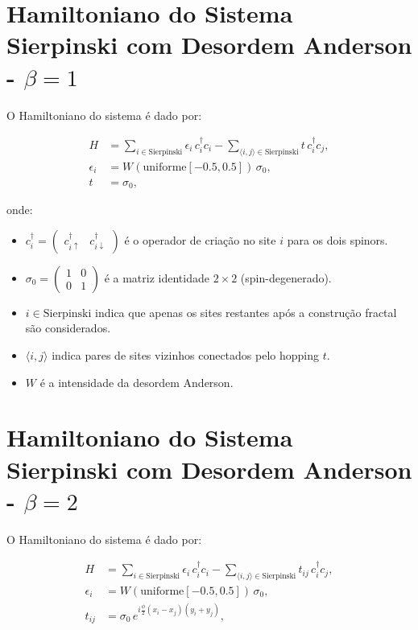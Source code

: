 \documentclass[a4paper,12pt]{article}
\begin{document}
	
	\section*{Hamiltoniano do Sistema Sierpinski com Desordem Anderson - $\beta=1$}
	
	O Hamiltoniano do sistema é dado por:
	
	\begin{equation}
		\begin{aligned}
			H &= \sum_{i \in \text{Sierpinski}} \epsilon_i \, c_i^\dagger c_i
			- \sum_{\langle i,j \rangle \in \text{Sierpinski}} t \, c_i^\dagger c_j, \\
			\epsilon_i &= W \left( \text{uniforme}[-0.5, 0.5] \right) \, \sigma_0, \\
			t &= \sigma_0,
		\end{aligned}
	\end{equation}
	
	\noindent onde:
	
	\begin{itemize}
		\item $c_i^\dagger = \begin{pmatrix} c_{i\uparrow}^\dagger & c_{i\downarrow}^\dagger \end{pmatrix}$ é o operador de criação no site $i$ para os dois spinors.
		\item $\sigma_0 = \begin{pmatrix} 1 & 0 \\ 0 & 1 \end{pmatrix}$ é a matriz identidade $2 \times 2$ (spin-degenerado).
		\item $i \in \text{Sierpinski}$ indica que apenas os sites restantes após a construção fractal são considerados.
		\item $\langle i,j \rangle$ indica pares de sites vizinhos conectados pelo hopping $t$.
		\item $W$ é a intensidade da desordem Anderson.
	\end{itemize}
	
	
	
	
	\section*{Hamiltoniano do Sistema Sierpinski com Desordem Anderson - $\beta=2$}
	
	
	O Hamiltoniano do sistema é dado por:
	
	\begin{equation}
		\begin{aligned}
			H &= \sum_{i \in \text{Sierpinski}} \epsilon_i \, c_i^\dagger c_i
			- \sum_{\langle i,j \rangle \in \text{Sierpinski}} t_{ij} \, c_i^\dagger c_j, \\
			\epsilon_i &= W \left( \text{uniforme}[-0.5, 0.5] \right) \, \sigma_0, \\
			t_{ij} &= \sigma_0 \, e^{ i \frac{\phi}{2} (x_i - x_j)(y_i + y_j) },
		\end{aligned}
	\end{equation}
	
\end{document}
